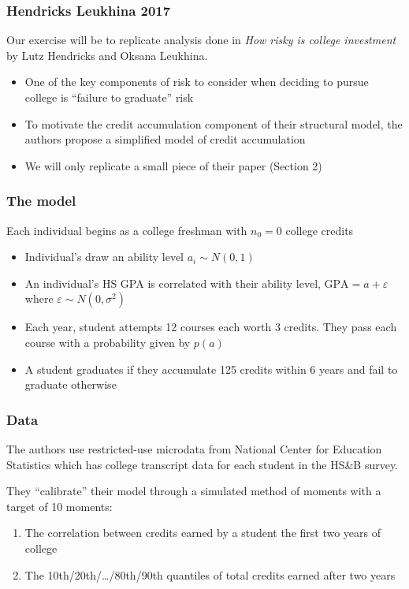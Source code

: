 \documentclass[10pt]{beamer}
\begin{document}
  \begin{frame} \frametitle{Hendricks Leukhina 2017}

    Our exercise will be to replicate analysis done in \textit{How risky is college
    investment} by Lutz Hendricks and Oksana Leukhina.

    \begin{itemize}
      \item One of the key components of risk to consider when deciding to pursue college
        is ``failure to graduate'' risk
      \item To motivate the credit accumulation component of their structural model, the authors
            propose a simplified model of credit accumulation
      \item We will only replicate a small piece of their paper (Section 2)
    \end{itemize}

  \end{frame}

  \begin{frame} \frametitle{The model}

    Each individual begins as a college freshman with $n_0 = 0$ college credits

    \begin{itemize}
      \item Individual's draw an ability level $a_i \sim N(0, 1)$
      \item An individual's HS GPA is correlated with their ability level,
        $\text{GPA} = a + \varepsilon$ where $\varepsilon \sim N(0, \sigma^2)$
      \item Each year, student attempts 12 courses each worth 3 credits. They pass each
        course with a probability given by $p(a)$
      \item A student graduates if they accumulate 125 credits within 6 years and fail
        to graduate otherwise
    \end{itemize}

  \end{frame}

  \begin{frame} \frametitle{Data}

    The authors use restricted-use microdata from National Center for Education
    Statistics which has college transcript data for each student in the HS\&B survey.

    They ``calibrate'' their model through a simulated method of moments with a target
    of 10 moments:

    \begin{enumerate}
      \item The correlation between credits earned by a student the first two years of
        college
      \item The 10th/20th/\dots/80th/90th quantiles of total credits earned after two
        years
    \end{enumerate}

  \end{frame}
\end{document}
